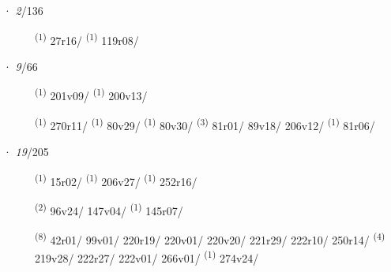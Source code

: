 \noindent{} · \textit{2}/136 \LEMMALINE
\begin{description}
    \item[]  \textsuperscript{(1)} \mbox{27r16/} \textsuperscript{(1)} \mbox{119r08/}
\end{description}
\ENTRYEND
\noindent{} · \textit{9}/66 \LEMMALINE
\begin{description}
    \item[]  \textsuperscript{(1)} \mbox{201v09/} \CASEBREAK {} \textsuperscript{(1)} \mbox{200v13/}
    \item[]  \textsuperscript{(1)} \mbox{270r11/} \CASEBREAK {} \textsuperscript{(1)} \mbox{80v29/} \CASEBREAK {} \textsuperscript{(1)} \mbox{80v30/} \CASEBREAK {} \textsuperscript{(3)} \mbox{81r01/} \mbox{89v18/} \mbox{206v12/} \CASEBREAK {} \textsuperscript{(1)} \mbox{81r06/}
\end{description}
\ENTRYEND
\noindent{} · \textit{19}/205 \LEMMALINE
\begin{description}
    \item[]  \textsuperscript{(1)} \mbox{15r02/} \textsuperscript{(1)} \mbox{206v27/} \textsuperscript{(1)} \mbox{252r16/}
    \item[]  \textsuperscript{(2)} \mbox{96v24/} \mbox{147v04/} \textsuperscript{(1)} \mbox{145r07/}
    \item[]  \textsuperscript{(8)} \mbox{42r01/} \mbox{99v01/} \mbox{220r19/} \mbox{220v01/} \mbox{220v20/} \mbox{221r29/} \mbox{222r10/} \mbox{250r14/} \textsuperscript{(4)} \mbox{219v28/} \mbox{222r27/} \mbox{222v01/} \mbox{266v01/} \textsuperscript{(1)} \mbox{274v24/}
\end{description}
